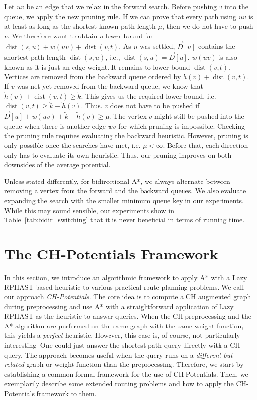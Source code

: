 \documentclass[manuscript]{acmart}
\newcommand*{\dist}{\operatorname{dist}}
\begin{document}
Let $uv$ be an edge that we relax in the forward search.
Before pushing $v$ into the queue, we apply the new pruning rule.
If we can prove that every path using $uv$ is at least as long as the shortest known path length $\mu$, then we do not have to push $v$.
We therefore want to obtain a lower bound for $\dist(s,u)+w(uv)+\dist(v,t)$.
As $u$ was settled, $\overrightarrow{D}[u]$ contains the shortest path length $\dist(s,u)$, i.e., $\dist(s,u)=\overrightarrow{D}[u]$.
$w(uv)$ is also known as it is just an edge weight.
It remains to lower bound $\dist(v,t)$.
Vertices are removed from the backward queue ordered by $\overleftarrow{h}(v) + \dist(v,t)$.
If $v$ was not yet removed from the backward queue, we know that $\overleftarrow{h}(v) + \dist(v,t) \geq \overleftarrow{k}$.
This gives us the required lower bound, i.e. $\dist(v,t) \geq \overleftarrow{k}-\overleftarrow{h}(v)$.
Thus, $v$ does not have to be pushed if $\overrightarrow{D}[u]+w(uv)+\overleftarrow{k}-\overleftarrow{h}(v)\ge \mu$.
The vertex $v$ might still be pushed into the queue when there is another edge $wv$ for which pruning is impossible.
Checking the pruning rule requires evaluating the backward heuristic.
However, pruning is only possible once the searches have met, i.e. $\mu < \infty$.
Before that, each direction only has to evaluate its own heuristic.
Thus, our pruning improves on both downsides of the average potential.

Unless stated differently, for bidirectional A*, we always alternate between removing a vertex from the forward and the backward queues.
We also evaluate expanding the search with the smaller minimum queue key in our experiments.
While this may sound sensible, our experiments show in Table~\ref{tab:bidir_switching} that it is never beneficial in terms of running time.

\section{The CH-Potentials Framework}\label{sec:framework}

In this section, we introduce an algorithmic framework to apply A* with a Lazy RPHAST-based heuristic to various practical route planning problems.
We call our approach \emph{CH-Potentials}.
The core idea is to compute a CH augmented graph during preprocessing and use A* with a straightforward application of Lazy RPHAST as the heuristic to answer queries.
When the CH preprocessing and the A* algorithm are performed on the same graph with the same weight function, this yields a \emph{perfect} heuristic.
However, this case is, of course, not particularly interesting.
One could just answer the shortest path query directly with a CH query.
The approach becomes useful when the query runs on a \emph{different but related} graph or weight function than the preprocessing.
Therefore, we start by establishing a common formal framework for the use of CH-Potentials.
Then, we exemplarily describe some extended routing problems and how to apply the CH-Potentials framework to them.
\end{document}
